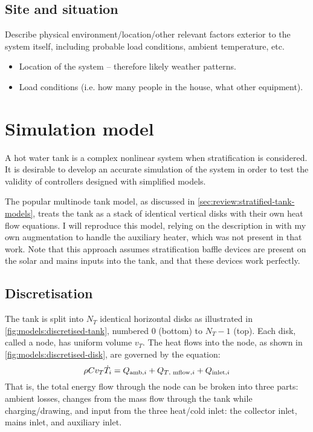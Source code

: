 \subsection{Site and situation}

Describe physical environment/location/other relevant factors exterior to the system itself, including probable load conditions, ambient temperature, etc.

\begin{itemize}
   \item Location of the system -- therefore likely weather patterns.
   \item Load conditions (i.e. how many people in the house, what other equipment).
\end{itemize}

\section{Simulation model}
\label{sec:models:simulation}

A hot water tank is a complex nonlinear system when stratification is considered.
It is desirable to develop an accurate simulation of the system in order to test the validity of controllers designed with simplified models.

The popular multinode tank model, as discussed in \autoref{sec:review:stratified-tank-models}, treats the tank as a stack of identical vertical disks with their own heat flow equations.
I will reproduce this model, relying on the description in \textcite{Cristofari02} with my own augmentation to handle the auxiliary heater, which was not present in that work.
Note that this approach assumes stratification baffle devices are present on the solar and mains inputs into the tank, and that these devices work perfectly.

\subsection{Discretisation}

The tank is split into $N_T$ identical horizontal disks as illustrated in \autoref{fig:models:discretised-tank}, numbered $0$ (bottom) to $N_T-1$ (top).
Each disk, called a node, has uniform volume $v_T$.
The heat flows into the node, as shown in \autoref{fig:models:discretised-disk}, are governed by the equation:
\begin{equation}
   \label{eq:tank-node-dT}
   \rho C v_T \dot{T}_i = Q_{\text{amb}, i} + Q_{\text{$T$, mflow}, i} + Q_{\text{inlet}, i}
\end{equation}
That is, the total energy flow through the node can be broken into three parts: ambient losses, changes from the mass flow through the tank while charging/drawing, and input from the three heat/cold inlet: the collector inlet, mains inlet, and auxiliary inlet.

